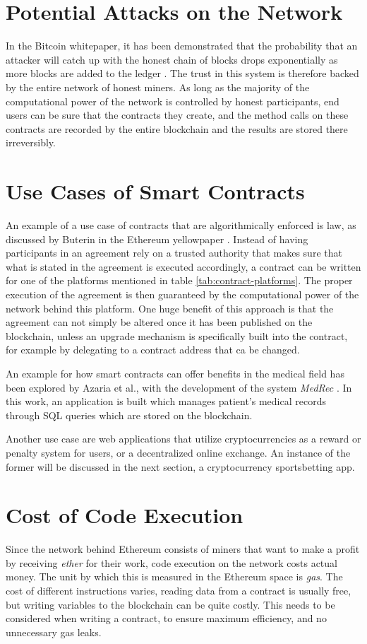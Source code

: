 \section*{Potential Attacks on the Network}
In the Bitcoin whitepaper, it has been demonstrated that the probability that an attacker will catch up with the honest chain of blocks drops exponentially as more blocks are added to the ledger \cite[p.~7]{Nakamoto2009}. The trust in this system is therefore backed by the entire network of honest miners. 
\newpage
As long as the majority of the computational power of the network is controlled by honest participants, end users can be sure that the contracts they create, and the method calls on these contracts are recorded by the entire blockchain and the results are stored there irreversibly.
\section*{Use Cases of Smart Contracts}
An example of a use case of contracts that are algorithmically enforced is law, as discussed by Buterin in the Ethereum yellowpaper \cite[p.~2]{Buterin2013}. Instead of having participants in an agreement rely on a trusted authority that makes sure that what is stated in the agreement is executed accordingly, a contract can be written for one of the platforms mentioned in table \ref{tab:contract-platforms}. The proper execution of the agreement is then guaranteed by the computational power of the network behind this platform. One huge benefit of this approach is that the agreement can not simply be altered once it has been published on the blockchain, unless an upgrade mechanism is specifically built into the contract, for example by delegating to a contract address that ca be changed.

An example for how smart contracts can offer benefits in the medical field has been explored by Azaria et al., with the development of the system \emph{MedRec} \cite{azaria2016medrec}. In this work, an application is built which manages patient's medical records through SQL queries which are stored on the blockchain. 

Another use case are web applications that utilize cryptocurrencies as a reward or penalty system for users, or a decentralized online exchange. An instance of the former will be discussed in the next section, a cryptocurrency sportsbetting app.
\section*{Cost of Code Execution}
Since the network behind Ethereum consists of miners that want to make a profit by receiving \emph{ether} for their work, code execution on the network costs actual money. The unit by which this is measured in the Ethereum space is \emph{gas}. The cost of different instructions varies, reading data from a contract is usually free, but writing variables to the blockchain can be quite costly. This needs to be considered when writing a contract, to ensure maximum efficiency, and no unnecessary gas leaks.

